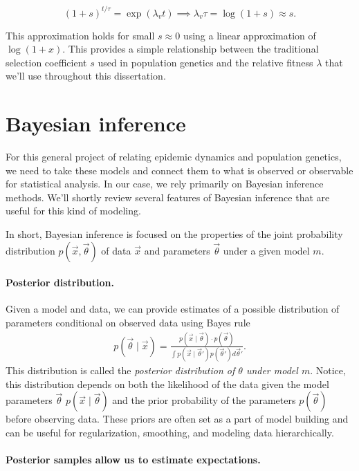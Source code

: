 \begin{equation}
(1 + s)^{t / \tau} = \exp(\lambda_v t) \implies \lambda_v \tau = \log{(1 + s)} \approx s.
\end{equation}

This approximation holds for small $s \approx 0$ using a linear approximation of $\log(1+x)$.
This provides a simple relationship between the traditional selection coefficient $s$ used in population genetics and the relative fitness $\lambda$ that we'll use throughout this dissertation.

\section{Bayesian inference}%

For this general project of relating epidemic dynamics and population genetics, we need to take these models and connect them to what is observed or observable for statistical analysis.
In our case, we rely primarily on Bayesian inference methods.
We'll shortly review several features of Bayesian inference that are useful for this kind of modeling.

In short, Bayesian inference is focused on the properties of the joint probability distribution  $p(\vec{x}, \vec{\theta})$ of data $\vec{x}$ and parameters $\vec{\theta}$ under a given model $m$.

\paragraph{Posterior distribution.}
Given a model and data, we can provide estimates of a possible distribution of parameters conditional on observed data using Bayes rule
\begin{align}
p(\vec{\theta} \mid \vec{x}) = \frac{p(\vec{x} \mid \vec{\theta})\cdot p(\vec{\theta})}{\int p(\vec{x} \mid \vec{\theta}') p(\vec{\theta}') d \vec{\theta}'}.
\end{align}
This distribution is called the \emph{posterior distribution of $\theta$ under model $m$}.
Notice, this distribution depends on both the likelihood of the data given the model parameters $\vec{\theta}$ $p(\vec{x} \mid \vec{\theta})$ and the prior probability of the parameters $p(\vec{\theta})$ before observing data.
These priors are often set as a part of model building and can be useful for regularization, smoothing, and modeling data hierarchically.

\paragraph{Posterior samples allow us to estimate expectations.}%

